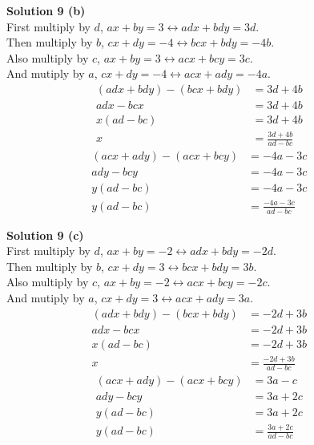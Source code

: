 \documentclass[6pt]{article}
\begin{document}
\textbf{Solution 9 (b)} \\
First multiply by $d$, $ax + by = 3 \leftrightarrow adx + bdy = 3d$. \\
Then multiply by $b$, $cx + dy = -4 \leftrightarrow bcx + bdy = -4b$. \\
Also multiply by $c$, $ax + by = 3 \leftrightarrow acx + bcy = 3c$. \\
And mutiply by $a$, $cx + dy  = -4 \leftrightarrow acx + ady = -4a$. 
\begin{align*}
    (adx + bdy) - (bcx + bdy) &= 3d + 4b && \\
    adx - bcx &= 3d + 4b && \\
    x(ad - bc) &= 3d + 4b && \\
    x &= \frac{3d + 4b}{ad - bc}
\end{align*}
\begin{align*}
    (acx + ady) - (acx + bcy) &= -4a - 3c && \\
    ady - bcy &= -4a - 3c && \\
    y(ad - bc) &= -4a - 3c && \\
    y(ad - bc) &= \frac{-4a - 3c}{ad - bc} 
\end{align*}

\textbf{Solution 9 (c)} \\
First multiply by $d$, $ax + by = -2 \leftrightarrow adx + bdy = -2d$. \\
Then multiply by $b$, $cx + dy = 3 \leftrightarrow bcx + bdy = 3b$. \\
Also multiply by $c$, $ax + by = -2 \leftrightarrow acx + bcy = -2c$. \\
And mutiply by $a$, $cx + dy  = 3 \leftrightarrow acx + ady = 3a$. 
\begin{align*}
    (adx + bdy) - (bcx + bdy) &= -2d + 3b && \\
    adx - bcx &= -2d + 3b && \\
    x(ad - bc) &= -2d + 3b && \\
    x &= \frac{-2d + 3b}{ad - bc}
\end{align*}
\begin{align*}
    (acx + ady) - (acx + bcy) &= 3a - c && \\
    ady - bcy &= 3a + 2c && \\
    y(ad - bc) &= 3a + 2c && \\
    y(ad - bc) &= \frac{3a + 2c}{ad - bc} 
\end{align*}
\end{document}
